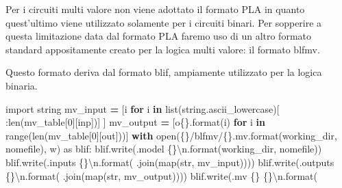 \documentclass[
  italian,
]{book}
\newenvironment{Shaded}{\begin{snugshade}}{\end{snugshade}}
\newcommand{\BuiltInTok}[1]{#1}
\newcommand{\CharTok}[1]{\textcolor[rgb]{0.31,0.60,0.02}{#1}}
\newcommand{\ControlFlowTok}[1]{\textcolor[rgb]{0.13,0.29,0.53}{\textbf{#1}}}
\newcommand{\DecValTok}[1]{\textcolor[rgb]{0.00,0.00,0.81}{#1}}
\newcommand{\ImportTok}[1]{#1}
\newcommand{\KeywordTok}[1]{\textcolor[rgb]{0.13,0.29,0.53}{\textbf{#1}}}
\newcommand{\NormalTok}[1]{#1}
\newcommand{\OperatorTok}[1]{\textcolor[rgb]{0.81,0.36,0.00}{\textbf{#1}}}
\newcommand{\SpecialCharTok}[1]{\textcolor[rgb]{0.00,0.00,0.00}{#1}}
\newcommand{\StringTok}[1]{\textcolor[rgb]{0.31,0.60,0.02}{#1}}
\begin{document}
Per i circuiti multi valore non viene adottato il formato PLA in quanto quest'ultimo viene utilizzato solamente per i circuiti binari. Per sopperire a questa limitazione data dal formato PLA faremo uso di un altro formato standard appositamente creato per la logica multi valore: il formato blfmv.

Questo formato deriva dal formato blif, ampiamente utilizzato per la logica binaria.

\begin{Shaded}
\begin{Highlighting}[]
\ImportTok{import}\NormalTok{ string}
\NormalTok{mv\_input }\OperatorTok{=}\NormalTok{ [i }\ControlFlowTok{for}\NormalTok{ i }\KeywordTok{in} \BuiltInTok{list}\NormalTok{(string.ascii\_lowercase)[}
\NormalTok{    :}\BuiltInTok{len}\NormalTok{(mv\_table[}\DecValTok{0}\NormalTok{][}\StringTok{\textquotesingle{}inp\textquotesingle{}}\NormalTok{])]}
\NormalTok{  ]}
\NormalTok{mv\_output }\OperatorTok{=}\NormalTok{ [}\StringTok{\textquotesingle{}o}\SpecialCharTok{\{\}}\StringTok{\textquotesingle{}}\NormalTok{.}\BuiltInTok{format}\NormalTok{(i) }\ControlFlowTok{for}\NormalTok{ i }\KeywordTok{in} \BuiltInTok{range}\NormalTok{(}\BuiltInTok{len}\NormalTok{(mv\_table[}\DecValTok{0}\NormalTok{][}\StringTok{\textquotesingle{}out\textquotesingle{}}\NormalTok{]))]}
\ControlFlowTok{with} \BuiltInTok{open}\NormalTok{(}\StringTok{\textquotesingle{}}\SpecialCharTok{\{\}}\StringTok{/blfmv/}\SpecialCharTok{\{\}}\StringTok{.mv\textquotesingle{}}\NormalTok{.}\BuiltInTok{format}\NormalTok{(working\_dir, nomefile), }\StringTok{\textquotesingle{}w\textquotesingle{}}\NormalTok{) }\ImportTok{as}\NormalTok{ blif:}
\NormalTok{  blif.write(}\StringTok{\textquotesingle{}.model }\SpecialCharTok{\{\}}\CharTok{\textbackslash{}n}\StringTok{\textquotesingle{}}\NormalTok{.}\BuiltInTok{format}\NormalTok{(working\_dir, nomefile))}
\NormalTok{  blif.write(}\StringTok{\textquotesingle{}.inputs }\SpecialCharTok{\{\}}\CharTok{\textbackslash{}n}\StringTok{\textquotesingle{}}\NormalTok{.}\BuiltInTok{format}\NormalTok{(}
      \StringTok{\textquotesingle{} \textquotesingle{}}\NormalTok{.join(}\BuiltInTok{map}\NormalTok{(}\BuiltInTok{str}\NormalTok{, mv\_input))))}
\NormalTok{  blif.write(}\StringTok{\textquotesingle{}.outputs }\SpecialCharTok{\{\}}\CharTok{\textbackslash{}n}\StringTok{\textquotesingle{}}\NormalTok{.}\BuiltInTok{format}\NormalTok{(}
      \StringTok{\textquotesingle{} \textquotesingle{}}\NormalTok{.join(}\BuiltInTok{map}\NormalTok{(}\BuiltInTok{str}\NormalTok{, mv\_output))))}
\NormalTok{  blif.write(}\StringTok{\textquotesingle{}.mv }\SpecialCharTok{\{\}}\StringTok{ }\SpecialCharTok{\{\}}\CharTok{\textbackslash{}n}\StringTok{\textquotesingle{}}\NormalTok{.}\BuiltInTok{format}\NormalTok{(}

\end{Highlighting}
\end{Shaded}
\end{document}
